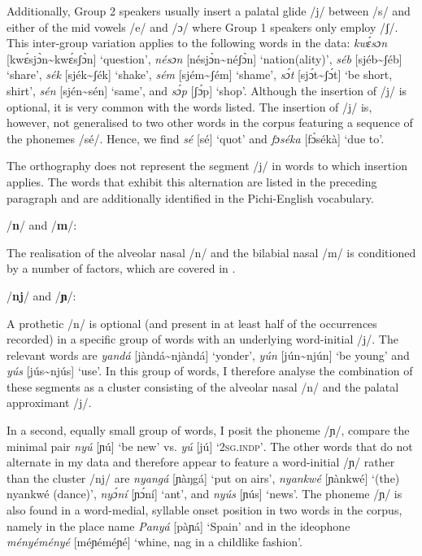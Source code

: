 Additionally, Group 2 speakers usually insert a palatal glide /j/ between /s/ and either of the mid vowels /e/ and /ɔ/ where Group 1 speakers only employ /ʃ/{\fff}. This inter-group variation applies to the following words in the data: \textit{kwɛ́sɔn} [kwɛ́sjɔ̀n{\textasciitilde}kwɛ́sʃɔ̀n] ‘question’, \textit{nésɔn} [nésjɔ̀n{\textasciitilde}néʃɔ̀n] ‘nation(ality)’, \textit{séb} [sjéb{\textasciitilde}ʃéb] ‘share’, \textit{sék} [sjék{\textasciitilde}ʃék] ‘shake’, \textit{sém} [sjém{\textasciitilde}ʃém] ‘shame’, \textit{sɔ́t} [sjɔ́t{\textasciitilde}ʃɔ́t] ‘be short, shirt’, \textit{sén} [sjén{\textasciitilde}sén] ‘same’, and \textit{sɔ́p} [ʃɔ́p] ‘shop’. Although the insertion of /j/ is optional, it is very common with the words listed. The insertion of /j/ is, however, not generalised to two other words in the corpus featuring a sequence of the phonemes /sé/. Hence, we find \textit{sé} [sé] ‘quot’ and \textit{fɔséka} [fɔ̀sékà] ‘due to’. 



The orthography does not represent the segment /j/ in words to which insertion applies. The words that exhibit this alternation are listed in the preceding paragraph and are additionally identified in the Pichi-English vocabulary. 


/\textbf{n}/ and /\textbf{m}/: 

The realisation of the alveolar nasal /n/ and the bilabial nasal /m/ is conditioned by a number of factors, which are covered in . 

/\textbf{nj}/ and /\textbf{ɲ}/:

A prothetic /n/ is optional (and present in at least half of the occurrences recorded) in a specific group of words with an underlying word-initial /j/. The relevant words are \textit{yandá} [jàndá{\textasciitilde}njàndá] ‘yonder’, \textit{yún} [jún{\textasciitilde}njún] ‘be young’ and \textit{yús} [jús{\textasciitilde}njús] ‘use’. In this group of words, I therefore analyse the combination of these segments as a cluster consisting of the alveolar nasal /n/ and the palatal approximant /j/.


In a second, equally small group of words, I posit the phoneme /ɲ/, compare the minimal pair \textit{nyú} [ɲú] ‘be new’ vs. \textit{yú} [jú] \textsc{‘2sg.indp’}. The other words that do not alternate in my data and therefore appear to feature a word-initial /ɲ/ rather than the cluster /nj/ are \textit{nyangá} [ɲàŋgá] ‘put on airs’, \textit{nyankwé} [ɲànkwé] ‘(the) nyankwé (dance)’, \textit{nyɔ́ní} [ɲɔ́ní] ‘ant’, and \textit{nyús} [ɲús] ‘news’. The phoneme /ɲ/ is also found in a word-medial, syllable onset position in two words in the corpus, namely in the place name \textit{Panyá} [pàɲá] ‘Spain’ and in the ideophone \textit{ményéményé} [méɲéméɲé] ‘whine, nag in a childlike fashion’.



